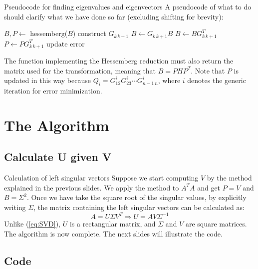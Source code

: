 \documentclass[10pt]{beamer}
\begin{document}
\begin{frame}{Pseudocode for finding eigenvalues and eigenvectors}
    A pseudocode of what to do should clarify what we have done so far (excluding shifting for brevity):
    \begin{algorithmic}
        \footnotesize
        \State $B, P \gets $ hessemberg($ B $)
                \State construct $G_{k \, k+1}$
                \State $B \gets G_{k \, k+1} B$
            \EndFor
                \State $B \gets B G_{k \, k+1}^T$
                \State $P \gets P G_{k \, k+1}^T$
            \EndFor
            \State update error
        \EndWhile
    \end{algorithmic}
    The function implementing the Hessemberg reduction must also return the matrix used for the transformation, meaning that $B = P H P^T$. \newline
    Note that $P$ is updated in this way because $Q_i = G_{12}^i G_{23}^i \cdots G_{n-1 \, n}^i$, where $i$ denotes the generic iteration for error minimization.
\end{frame}

\section{The Algorithm}

\subsection{Calculate U given V}

\begin{frame}{Calculation of left singular vectors}
    Suppose we start computing $V$ by the method explained in the previous slides. \newline
    We apply the method to $A^T A$ and get $P = V$ and $B = \Sigma^2$. \newline
    Once we have take the square root of the singular values, by explicitly writing $\Sigma$, the matrix containing the left singular vectors can be calculated as:
    $$
    A = U \Sigma V^T \Rightarrow U = A V \Sigma^{-1}
    $$
    Unlike (\ref{eq:SVD}), $U$ is a rectangular matrix, and $\Sigma$ and $V$ are square matrices. \newline
    The algorithm is now complete. The next slides will illustrate the code.
\end{frame}

\subsection{Code}
\end{document}
